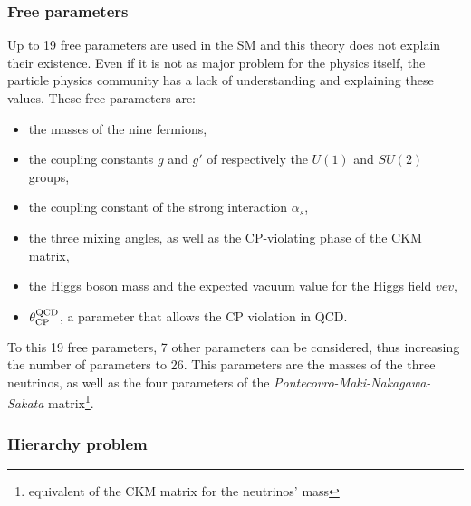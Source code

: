 
      \subsubsection{Free parameters}

      Up to 19 free parameters are used in the \gls{SM} and this theory does not explain their existence.
      Even if it is not as major problem for the physics itself, the particle physics community has a lack of understanding and explaining these values.
      These free parameters are: 
      \begin{itemize}
        \item the masses of the nine fermions,
        \item the coupling constants $g$ and $g'$ of respectively the $U(1)$ and $SU(2)$ groups,
        \item the coupling constant of the strong interaction $\alpha_s$,
        \item the three mixing angles, as well as the CP-violating phase of the CKM matrix,
        \item the Higgs boson mass and the expected vacuum value for the Higgs field $vev$,
        \item $\theta^{\rm{QCD}}_{\rm{CP}}$, a parameter that allows the CP violation in \gls{QCD}.
      \end{itemize}

      To this 19 free parameters, 7 other parameters can be considered, thus increasing the number of parameters to 26.
      This parameters are the masses of the three neutrinos, as well as the four parameters of the \textit{Pontecovro-Maki-Nakagawa-Sakata} matrix\footnote{equivalent of the CKM matrix for the neutrinos' mass}.
    
      \subsubsection{Hierarchy problem}


